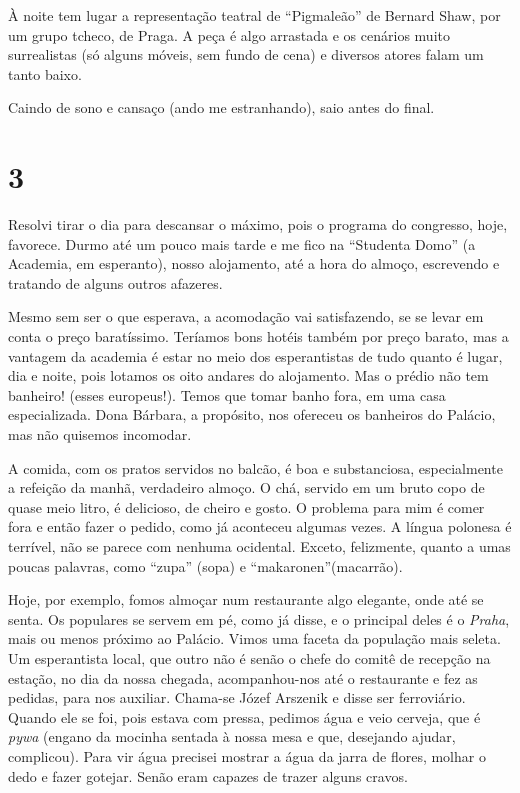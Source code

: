 À noite tem lugar a representação teatral de ``Pigmaleão'' de Bernard Shaw, por um grupo tcheco, de Praga. A peça é algo arrastada e os cenários muito surrealistas (só alguns móveis, sem fundo de cena) e diversos atores falam um tanto baixo.

Caindo de sono e cansaço (ando me estranhando), saio antes do final.

\section*{3 \adfflatleafright {}}
Resolvi tirar o dia para descansar o máximo, pois o programa do congresso, hoje, favorece. Durmo até um pouco mais tarde e me fico na ``Studenta Domo'' (a Academia, em esperanto), nosso alojamento, até a hora do almoço, escrevendo e tratando de alguns outros afazeres.

Mesmo sem ser o que esperava, a acomodação vai satisfazendo, se se levar em conta o preço baratíssimo. Teríamos bons hotéis também por preço barato, mas a vantagem da academia é estar no meio dos esperantistas de tudo quanto é lugar, dia e noite, pois lotamos os oito andares do alojamento. Mas o prédio não tem banheiro! (esses europeus!). Temos que tomar banho fora, em uma casa especializada. Dona Bárbara, a propósito, nos ofereceu os banheiros do Palácio, mas não quisemos incomodar.

A comida, com os pratos servidos no balcão, é boa e substanciosa, especialmente a refeição da manhã, verdadeiro almoço. O chá, servido em um bruto copo de quase meio litro, é delicioso, de cheiro e gosto. O problema para mim é comer fora e então fazer o pedido, como já aconteceu algumas vezes. A língua polonesa é terrível, não se parece com nenhuma ocidental. Exceto, felizmente, quanto a umas poucas palavras, como ``zupa'' (sopa) e ``makaronen''(macarrão).

Hoje, por exemplo, fomos almoçar num restaurante algo elegante, onde até se senta. Os populares se servem em pé, como já disse, e o principal deles é o \textit{Praha}, mais ou menos próximo ao Palácio. Vimos uma faceta da população mais seleta. Um esperantista local, que outro não é senão o chefe do comitê de recepção na estação, no dia da nossa chegada, acompanhou-nos até o restaurante e fez as pedidas, para nos auxiliar. Chama-se Józef Arszenik e disse ser ferroviário. Quando ele se foi, pois estava com pressa, pedimos água e veio cerveja, que é \textit{pywa} (engano da mocinha sentada à nossa mesa e que, desejando ajudar, complicou). Para vir água precisei mostrar a água da jarra de flores, molhar o dedo e fazer gotejar. Senão eram capazes de trazer alguns cravos.

